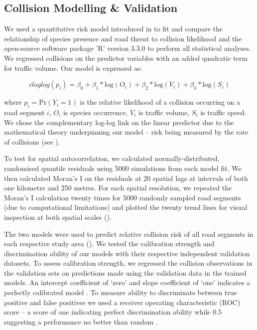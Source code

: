 \subsection{Collision Modelling \& Validation}

We used a quantitative risk model introduced in  to fit and compare the relationship of species presence and road threat to collision likelihood and the open-source software package ’R’ version 3.3.0 \citep{rdct16} to perform all statistical analyses. We regressed collisions on the predictor variables with an added quadratic term for traffic volume. Our model is expressed as:

\begin{equation} \label{eq:41}
cloglog(p_i) = \beta_0 + \beta_1*\text{log}(O_i) + \beta_2*\text{log}(V_i) + \beta_3*\text{log}(S_i)
\end{equation}

\noindent where $p_i=\text{Pr}(Y_i=1)$ is the relative likelihood of a collision occurring on a road segment $i$, $O_i$ is species occurrence, $V_i$ is traffic volume, $S_i$ is traffic speed. We chose the complementary log-log link on the linear predictor due to the mathematical theory underpinning our model -- risk being measured by the rate of collisions (see ).

To test for spatial autocorrelation, we calculated normally-distributed, randomised quantile residuals \citep{dunn96} using 5000 simulations from each model fit. We then calculated Moran's I on the residuals at 20 spatial lags at intervals of both one kilometre and 250 metres.  For each spatial resolution, we repeated the Moran's I calculation twenty times for 5000 randomly sampled road segments (due to computational limitations) and plotted the twenty trend lines for visual inspection at both spatial scales ().

The two models were used to predict relative collision risk of all road segments in each respective study area ().  We tested the calibration strength and discrimination ability of our models with their respective independent validation datasets. To assess calibration strength, we regressed the collision observations in the validation sets on predictions made using the validation data in the trained models. An intercept coefficient of `zero' and slope coefficient of `one' indicates a perfectly calibrated model \citep[see][]{mill91}. To measure ability to discriminate between true positive and false positives we used a receiver operating characteristic (ROC) score -- a score of one indicating perfect discrimination ability while 0.5 suggesting a performance no better than random \citep[see][]{metz78}.

